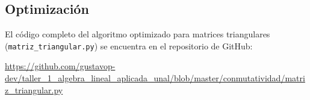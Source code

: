 \subsection{Optimización}
El código completo del algoritmo optimizado para matrices triangulares (\texttt{matriz\_triangular.py}) se encuentra en el repositorio de GitHub:

\begin{center}
\url{https://github.com/gustavop-dev/taller_1_algebra_lineal_aplicada_unal/blob/master/conmutatividad/matriz_triangular.py}
\end{center}